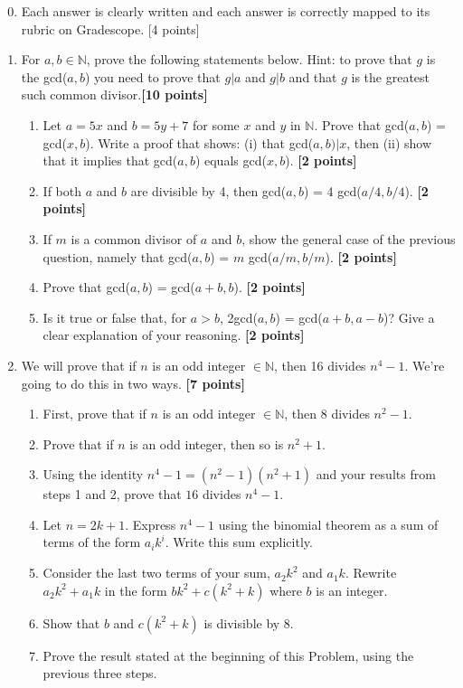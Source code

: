 \documentclass{article}
\begin{document}
\begin{enumerate}
\setcounter{enumi}{-1} 
\item Each answer is clearly written and each answer is correctly mapped to its rubric on Gradescope. [4 points]

\item  For $a,b \in \mathbb{N}$, prove the following statements below. Hint: to prove that $g$ is the gcd($a,b$) you need to prove that $g | a$ and $g|b$ and that $g$ is the greatest such common divisor.\textbf{[10 points]}
\begin{enumerate}
    \item Let $a = 5x$ and $b = 5y+7$ for some $x$ and $y$ in $\mathbb{N}$. Prove that gcd($a,b$) = gcd($x,b$). Write a proof that shows: (i) that gcd($a,b)| x$, then (ii) show that it implies that gcd($a,b$) equals gcd($x,b$). \textbf{[2 points]}
    \item If both $a$ and $b$ are divisible by 4, then gcd($a,b$) = 4 gcd($a/4,b/4$). \textbf{[2 points]}
    \item If $m$ is a common divisor of $a$ and $b$, show the general case of the previous question, namely that gcd($a,b$) = $m$ gcd($a/m,b/m$). \textbf{[2 points]}
    \item Prove that gcd($a,b$) = gcd($a+b,b$). \textbf{[2 points]}
    \item Is it true or false that, for $a>b$, 2gcd($a,b$) = gcd($a+b,a-b$)? Give a clear explanation of your reasoning. \textbf{[2 points]}
\end{enumerate}

\item We will prove that if $n$ is an odd integer $\in \mathbb{N}$, then 16 divides $n^4 - 1$. We're going to do this in two ways. \textbf{[7 points]} 
\begin{enumerate}
    \item First, prove that if $n$ is an odd integer $\in \mathbb{N}$, then 8 divides $n^2 - 1$.
    \item Prove that if $n$ is an odd integer, then so is $n^2+1$.
    \item Using the identity $n^4 - 1 = (n^2 - 1)(n^2 + 1)$ and your results from steps 1 and 2, prove that $16$ divides $n^4 - 1$.
    
    \item Let $n = 2k + 1$. Express $n^4 - 1$ using the binomial theorem as a sum of terms of the form $a_i k^i$. Write this sum explicitly.
    \item Consider the last two terms of your sum, $a_2 k^2$ and $a_1 k$. Rewrite $a_2 k^2 + a_1 k$ in the form $b k^2 + c(k^2 + k)$ where $b$ is an integer.
    \item Show that $b$ and \(c(k^2+k)\) is divisible by 8.
    \item Prove the result stated at the beginning of this Problem, using the previous three steps. 
\end{enumerate}


\end{enumerate}
\end{document}
